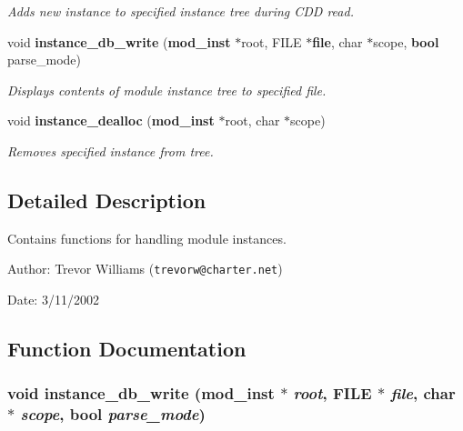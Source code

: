 \begin{CompactItemize}
\begin{CompactList}\small\item\em Adds new instance to specified instance tree during CDD read. \item\end{CompactList}\item 
void {\bf instance\_\-db\_\-write} ({\bf mod\_\-inst} $\ast$root, FILE $\ast${\bf file}, char $\ast$scope, {\bf bool} parse\_\-mode)
\begin{CompactList}\small\item\em Displays contents of module instance tree to specified file. \item\end{CompactList}\item 
void {\bf instance\_\-dealloc} ({\bf mod\_\-inst} $\ast$root, char $\ast$scope)
\begin{CompactList}\small\item\em Removes specified instance from tree. \item\end{CompactList}\end{CompactItemize}


\subsection{Detailed Description}
Contains functions for handling module instances. 

\begin{Desc}
\item[Author:]Trevor Williams ({\tt trevorw@charter.net}) \end{Desc}
\begin{Desc}
\item[Date:]3/11/2002 \end{Desc}


\subsection{Function Documentation}
\subsubsection{\setlength{\rightskip}{0pt plus 5cm}void instance\_\-db\_\-write ({\bf mod\_\-inst} $\ast$ {\em root}, FILE $\ast$ {\em file}, char $\ast$ {\em scope}, {\bf bool} {\em parse\_\-mode})}\label{instance_8h_a5}


